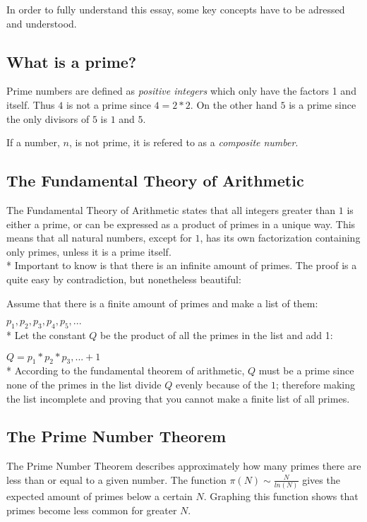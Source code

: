 \documentclass[main.tex]{subfiles}
\begin{document}
In order to fully understand this essay, some key concepts have to be adressed and understood.

\subsection{What is a prime?}
Prime numbers are defined as \textit{positive integers} which only have the factors 1 and itself. Thus $4$ is not a prime since $4 = 2 * 2$. On the other hand $5$ is a prime since the only divisors of $5$ is $1$ and $5$. 

If a number, $n$, is not prime, it is refered to as a \textit{composite number}.

\subsection{The Fundamental Theory of Arithmetic}
The Fundamental Theory of Arithmetic \cite{theorem:arithmetic} states that all integers greater than $1$ is either a prime, or can be expressed as a product of primes in a unique way. This means that all natural numbers, except for $1$, has its own factorization containing only primes, unless it is a prime itself.
\newline
\\*
Important to know is that there is an infinite amount of primes. The proof is a quite easy by contradiction, but nonetheless beautiful:

\begin{mdframed}
    Assume that there is a finite amount of primes and make a list of them:

    $p_1, p_2, p_3, p_4, p_5, ...$ 
    \newline
    \\*
    Let the constant $Q$ be the product of all the primes in the list and add 1:

    $Q = p_1 * p_2 * p_3, ... + 1$
    \newline
    \\*
    According to the fundamental theorem of arithmetic, $Q$ must be a prime since none of the primes in the list divide $Q$ evenly because of the $1$; therefore making the list incomplete and proving that you cannot make a finite list of all primes. 
\end{mdframed}

\subsection{The Prime Number Theorem}
The Prime Number Theorem \cite{theorem:prime_num} describes approximately how many primes there are less than or equal to a given number. The function $\pi(N) \sim \frac{N}{ln(N)}$ gives the expected amount of primes below a certain $N$. Graphing this function shows that primes become less common for greater $N$.
\end{document}

